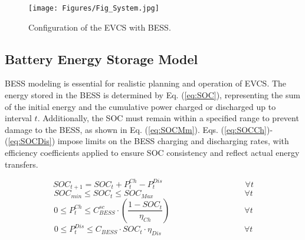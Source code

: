 \documentclass[10pt, journal]{IEEEtran}
\begin{document}
\vspace{-4mm}
{\setlength{\belowcaptionskip}{-5mm}
\begin{figure}[!b]
\centering
\texttt{[image: Figures/Fig\_System.jpg]}
\caption{Configuration of the EVCS with BESS.}
\label{Fig_system}
\end{figure}}

\vspace{-2mm}
\subsection{Battery Energy Storage Model}
BESS modeling is essential for realistic planning and operation of EVCS. The energy stored in the BESS is determined by Eq. (\ref{eq:SOC}), representing the sum of the initial energy and the cumulative power charged or discharged up to interval \(t\). Additionally, the SOC must remain within a specified range to prevent damage to the BESS, as shown in Eq.  (\ref{eq:SOCMm}). Eqs. (\ref{eq:SOCCh})-(\ref{eq:SOCDis}) impose limits on the BESS charging and discharging rates, with efficiency coefficients applied to ensure SOC consistency and reflect actual energy transfers.

\vspace{-4mm}
{\small
\begin{equation}
    \label{eq:SOC}
    SOC_{t+1} = SOC_t + P_t^{Ch} - P_t^{Dis} \quad \quad \quad \quad \quad  \quad \quad \quad \quad \quad \forall t
\end{equation}
\begin{equation}
    \label{eq:SOCMm}
    SOC_{min} \leq SOC_t \leq SOC_{Max} \quad \quad \quad \quad \quad \quad \quad \quad \quad \quad \quad \forall t
\end{equation}
\begin{equation}
    \label{eq:SOCCh}
    0 \leq P_t^{Ch} \leq C_{BESS}^{sc} \cdot \left(\frac{1 - SOC_t}{\eta_{Ch}} \right) \quad \quad \quad \quad \quad \quad \quad \quad \quad \forall t
\end{equation}
\vspace{-3mm}
\begin{equation}
    \label{eq:SOCDis}
    0 \leq  P_t^{Dis} \leq C_{BESS} \cdot SOC_t \cdot {\eta_{Dis}} \quad \quad \quad \quad  \quad \quad \quad \quad \quad \quad \forall t
\end{equation}}
\end{document}
